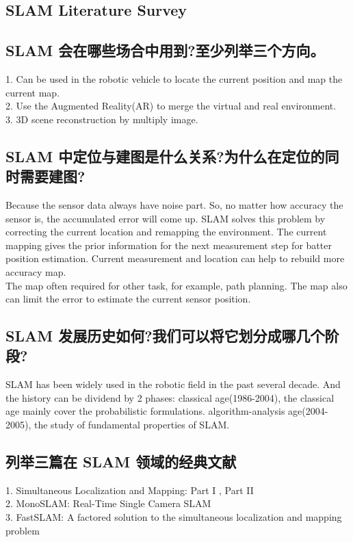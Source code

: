 \documentclass{article}
\begin{document}
\begin{CJK*}{UTF8}{gbsn}
\section{SLAM Literature Survey}
\subsection{SLAM 会在哪些场合中用到?至少列举三个方向。}
1. Can be used in the robotic vehicle to locate the current position and map the current map.\\
2. Use the Augmented Reality(AR) to merge the virtual and real environment. \\
3. 3D scene reconstruction by multiply image. 

\subsection{SLAM 中定位与建图是什么关系?为什么在定位的同时需要建图?}
Because the sensor data always have noise part. So, no matter how accuracy the sensor is, the accumulated error will come up. SLAM solves this problem by correcting the current location and remapping the environment. The current mapping gives the prior information for the next measurement step for batter position estimation. Current measurement and location can help to rebuild more accuracy map. \\
The map often required for other task, for example, path planning. The map also can limit the error to estimate the current sensor position. 

\subsection{SLAM 发展历史如何?我们可以将它划分成哪几个阶段?}
SLAM has been widely used in the robotic field in the past several decade. And the history can be dividend by 2 phases: 
classical age(1986-2004), the classical age mainly cover the probabilistic formulations. 
algorithm-analysis age(2004-2005), the study of fundamental properties of SLAM. 

\subsection{列举三篇在 SLAM 领域的经典文献}
1. Simultaneous Localization and Mapping: Part I , Part II \\
2. MonoSLAM: Real-Time Single Camera SLAM \\
3. FastSLAM: A factored solution to the simultaneous localization and mapping problem


\end{CJK*}
\end{document}
